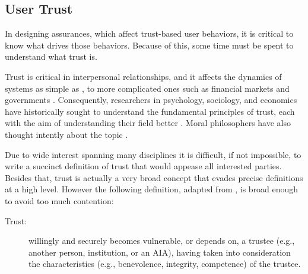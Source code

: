 \subsection{User Trust}
    In designing assurances, which affect trust-based user behaviors, it is critical to know what drives those behaviors. Because of this, some time must be spent to understand what trust is. 

    Trust is critical in interpersonal relationships, and it affects the dynamics of  systems as simple as   \cite{Lewicki2006-hj}, to more complicated ones such as financial markets and governments \cite{Fukuyama1995-un}. Consequently, researchers in psychology, sociology, and economics have historically sought to understand the fundamental principles of trust, each with the aim of understanding their field better \cite{Gambetta1988-pi}. Moral philosophers have also thought intently about the topic \cite{Baier1986-im}.

    Due to wide interest spanning many disciplines it is difficult, if not impossible, to write a succinct definition of trust that would appease all interested parties. Besides that, trust is actually a very broad concept that evades precise definitions at a high level. However the following definition, adapted from \cite{McKnight2004-vv}, is broad enough to avoid too much contention:

    \begin{description}
        \item [Trust:]  willingly and securely becomes vulnerable, or depends on, a trustee (e.g., another person, institution, or an AIA), having taken into consideration the characteristics (e.g., benevolence, integrity, competence) of the trustee.
    \end{description}

